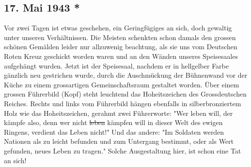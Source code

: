 \subsection{17. Mai 1943 *}

Vor zwei Tagen ist etwas geschehen, ein Geringf\"{u}giges an sich, doch gewaltig unter unseren Verh\"{a}ltnissen.
Die Meisten schenkten schon damals den grossen sch\"{o}nen Gem\"{a}lden leider nur allzuwenig beachtung, als sie uns vom Deutschen Roten Kreuz geschickt worden waren und an den W\"{a}nden unseres Speisesaales aufgeh\"{a}ngt wurden.
Jetzt ist der Speisesaal, nachdem er in hellgelber Farbe g\"{a}nzlich neu gestrichen wurde, durch die Auschm\"{u}ckung der B\"{u}hnenwand vor der K\"{u}che zu einem grossartigen Gemeinschaftsraum gestaltet worden.
\"{U}ber einem grossen F\"{u}hrerbild (Kopf) steht leuchtend das Hoheitszeichen des Grossdeutschen Reiches.
Rechts und links vom F\"{u}hrerbild h\"{a}ngen ebenfalls in silberbronziertem Holz wie das Hoheitszeichen, gerahmt zwei F\"{u}hrerworte: "Wer leben will, der k\"{a}mpfe also, denn wer nicht \st{leben} k\"{a}mpfen will in dieser Welt des ewigen Ringens, verdient das Leben nicht!"
Und das andere: "Im Soldaten werden Nationen als zu leicht befunden und zum Untergang bestimmt, oder als Wert gefunden, neues Leben zu tragen."
Solche Ausgestaltung hier, ist schon eine Tat an sich!

\clearpage
